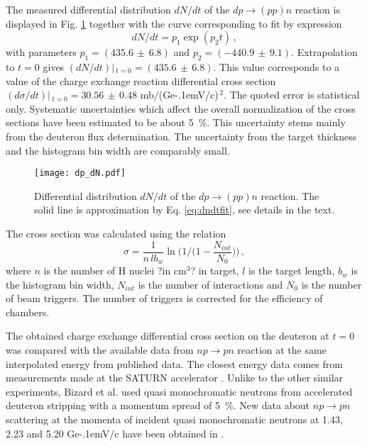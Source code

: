 \documentclass[twocolumn,epjc3]{svjour3}
\newcommand{\np}     {\ensuremath{np \rightarrow pn}\xspace}
\newcommand{\dpchex} {\ensuremath{dp \rightarrow (pp)n}\xspace}
\newcommand{\GeVc}   {Ge\kern-.1emV/c\xspace}
\begin{document}
The measured differential distribution $dN/dt$ of the \dpchex reaction is
displayed in Fig. \ref{fig:dndt} together with the curve corresponding to fit
by expression
\begin{equation}
  \label{eq:dndtfit}
  dN/dt = p_1\exp(p_2t)\,,
\end{equation}
with parameters $p_1=(435.6\,\pm\,6.8)$ and $p_2=(-440.9\,\pm\,9.1)$.
Extrapolation to $t=0$ gives $(dN/dt)|\,_{t=0}=(435.6\,\pm\,6.8)$. This value
corresponds to a value of the charge exchange reaction differential cross
section $(d\sigma/dt)|\,_{t=0}=30.56\,\pm\,0.48$ mb$/$(\GeVc)$^{\,2}$. The
quoted error is statistical only. Systematic uncertainties which affect the
overall normalization of the cross sections have been estimated to be about
5~\%. This uncertainty stems mainly from the deuteron flux determination. The
uncertainty from the target thickness and the histogram bin width are comparably
small.

\begin{figure}[h]
  \centering
  \texttt{[image: dp\_dN.pdf]}
  \caption{Differential distribution $dN/dt$ of the \dpchex reaction. The solid
    line is approximation by Eq. \eqref{eq:dndtfit}, see details in the text.}
  \label{fig:dndt}
\end{figure}

The cross section was calculated using the relation
\begin{equation}
  \sigma =
  \frac{1}{n\,lb_w}\ln\bigg(1\Big/\Big(1-\frac{N_{int}}{N_0}\Big)\bigg)\,,
\end{equation}
where $n$ is the number of H nuclei ?in cm$^3$? in target, $l$ is the target
length, $b_w$ is the histogram bin width, $N_{int}$ is the number of
interactions and $N_0$ is the number of beam triggers. The number of triggers is
corrected for the efficiency of chambers.

The obtained charge exchange differential cross section on the deuteron at $t=0$
was compared with the available data from \np reaction at the same interpolated
energy from published data. The closest energy data comes from measurements made
at the SATURN accelerator \cite{biz75,bys78}. Unlike to the other similar
experiments, Bizard et al. \cite{biz75} used quasi monochromatic neutrons from
accelerated deuteron stripping with a momentum spread of 5~\%. New data about
\np scattering at the momenta of incident quasi monochromatic neutrons at 1.43,
2.23 and 5.20 \GeVc have been obtained in \cite{tro14}.
\end{document}
